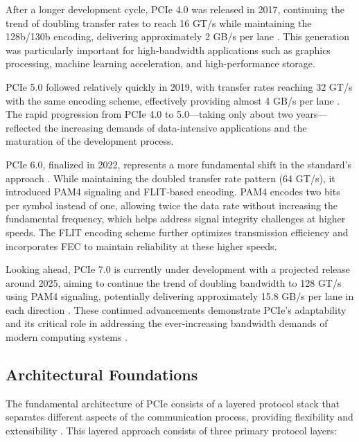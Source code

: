 After a longer development cycle, \ac{PCIe} 4.0 was released in 2017, 
continuing the trend of doubling transfer rates to reach 16 \ac{GT/s} while 
maintaining the 128b/130b encoding, delivering approximately 2 GB/s per 
lane \parencite{pcisig2017}. This generation was particularly 
important for high-bandwidth applications such as graphics processing, 
machine learning acceleration, and high-performance storage.

\ac{PCIe} 5.0 followed relatively quickly in 2019, with transfer rates 
reaching 32 \ac{GT/s} with the same encoding scheme, effectively 
providing almost 4 GB/s per lane \parencite{pcisig2019}. 
The rapid progression from \ac{PCIe} 4.0 to 5.0—taking only about 
two years—reflected the increasing demands of data-intensive applications 
and the maturation of the development process.

\ac{PCIe} 6.0, finalized in 2022, represents a more fundamental 
shift in the standard's approach \parencite{pcisig2022}. 
While maintaining the doubled transfer rate pattern (64 \ac{GT/s}), 
it introduced \ac{PAM4} signaling and \ac{FLIT}-based encoding. \ac{PAM4} 
encodes two bits per symbol instead of one, allowing twice the data rate 
without increasing the fundamental frequency, which helps address signal 
integrity challenges at higher speeds. 
The \ac{FLIT} encoding scheme further optimizes transmission efficiency 
and incorporates \ac{FEC} to maintain reliability at these higher speeds.

Looking ahead, \ac{PCIe} 7.0 is currently under development with a projected 
release around 2025, aiming to continue the trend of doubling bandwidth to 
128 \ac{GT/s} using \ac{PAM4} signaling, potentially delivering approximately 
15.8 GB/s per lane in each direction \parencite{pcisig2023}. These 
continued advancements demonstrate \ac{PCIe}'s adaptability and its critical 
role in addressing the ever-increasing bandwidth demands of modern computing 
systems \parencite{mangla2019pcie}.

\subsection{Architectural Foundations}
\label{subsec:pcie_architecture_foundations}

The fundamental architecture of \ac{PCIe} consists of a layered protocol stack 
that separates different aspects of the communication process, providing 
flexibility and extensibility \parencite[pp.~22-26]{pcisig2003}. This layered 
approach consists of three primary protocol layers:

